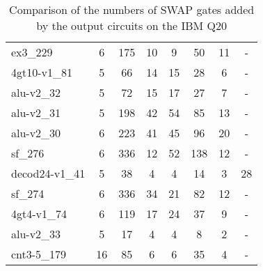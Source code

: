 \documentclass[journal]{IEEEtran}
\begin{document}
\begin{table*}[htbp]
\begin{center}
\begin{tabular}{|p{4.3cm}<{\centering}|c|c|c|c|c|c|c|}
ex3\_229 & 6 & 175 & 10 & 9 & 50 & 11& - \\
4gt10-v1\_81 & 5 & 66 & 14 & 15 & 28 & 6& - \\
alu-v2\_32 & 5 & 72 & 15 & 17 & 27 & 7& - \\
alu-v2\_31 & 5 & 198 & 42 & 54 & 85 & 13& - \\
alu-v2\_30 & 6 & 223 & 41 & 45 & 96 & 20& - \\
sf\_276 & 6 & 336 & 12 & 52 & 138 & 12& - \\
decod24-v1\_41 & 5 & 38 & 4 & 4 & 14 & 3& 28 \\
sf\_274 & 6 & 336 & 34 & 21 & 82 & 12& - \\
4gt4-v1\_74 & 6 & 119 & 17 & 24 & 37 & 9& - \\
alu-v2\_33 & 5 & 17 & 4 & 4 & 8 & 2& - \\
cnt3-5\_179 & 16 & 85 & 6 & 6 & 35 & 4& - \\
\hline
    \end{tabular} 
    \end{center}
    \caption{Comparison of  the numbers of SWAP gates added by the 
    output circuits on the IBM Q20 } 
    \label{tab2}
    \end{table*}
\end{document}

